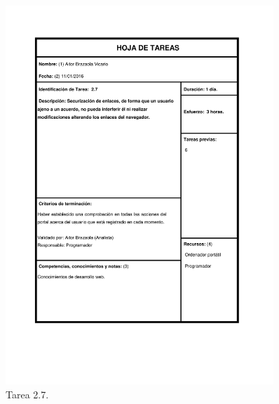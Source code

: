 \documentclass{DeustoFDP}
\begin{document}
\begin{figure}[H]
    \centering
    \includegraphics[width=0.9\textwidth]{fig/Tareas/27}
    \caption{Tarea 2.7.}
    \label{fig:t27}
\end{figure}
\end{document}
